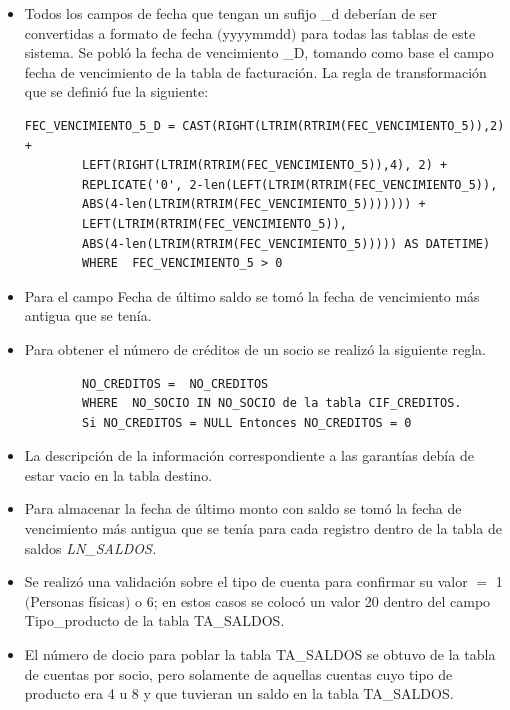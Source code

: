 \documentclass[a4paper,openright,12pt]{book}
\begin{document}
\begin{itemize}

\item Todos los campos de fecha que tengan un sufijo \_d deberían de ser
  convertidas a formato de fecha $($yyyymmdd$)$ para todas las tablas de este
  sistema. Se pobló la fecha de vencimiento \_D, tomando como base el campo
  fecha de vencimiento de la tabla de facturación. La regla de transformación
  que se definió fue la siguiente:

\begin{verbatim}
FEC_VENCIMIENTO_5_D = CAST(RIGHT(LTRIM(RTRIM(FEC_VENCIMIENTO_5)),2) +
        LEFT(RIGHT(LTRIM(RTRIM(FEC_VENCIMIENTO_5)),4), 2) +
        REPLICATE('0', 2-len(LEFT(LTRIM(RTRIM(FEC_VENCIMIENTO_5)),
        ABS(4-len(LTRIM(RTRIM(FEC_VENCIMIENTO_5))))))) +
        LEFT(LTRIM(RTRIM(FEC_VENCIMIENTO_5)),
        ABS(4-len(LTRIM(RTRIM(FEC_VENCIMIENTO_5))))) AS DATETIME)
        WHERE  FEC_VENCIMIENTO_5 > 0
\end{verbatim}

\item Para el campo Fecha de último saldo se tomó la fecha de vencimiento más
  antigua que se tenía.
\item Para obtener el número de créditos de un socio se realizó la siguiente
  regla.

\begin{verbatim}
        NO_CREDITOS =  NO_CREDITOS
        WHERE  NO_SOCIO IN NO_SOCIO de la tabla CIF_CREDITOS.
        Si NO_CREDITOS = NULL Entonces NO_CREDITOS = 0
\end{verbatim}

\item La descripción de la información correspondiente a las garantías debía
  de estar vacio en la tabla destino.

\item Para almacenar la fecha de último monto con saldo se tomó la fecha de
  vencimiento más antigua que se tenía para cada registro dentro de la tabla de
  saldos \textit{LN\_SALDOS.}

\item Se realizó una validación sobre el tipo de cuenta para confirmar su
  valor $=$ 1 $($Personas físicas$)$ o 6; en estos casos se colocó un valor 20
  dentro del campo Tipo\_producto de la tabla TA\_SALDOS.

\item El número de docio para poblar la tabla TA\_SALDOS se obtuvo de la
  tabla de cuentas por socio, pero solamente de aquellas cuentas cuyo tipo de
  producto era 4 u 8 y que tuvieran un saldo en la tabla TA\_SALDOS.


\end{itemize}
\end{document}
